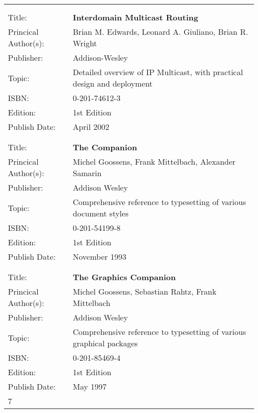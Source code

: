\documentclass[a4paper,12pt]{article}
\begin{document}
\begin{tabular}{ll}
	&	\\
	&	\\

Title: &	\textbf{Interdomain Multicast Routing}	\\
Princical Author(s): &	Brian M. Edwards, Leonard A. Giuliano, Brian R. Wright\\
Publisher:&	Addison-Wesley	\\	
Topic:	&	Detailed overview of IP Multicast, with practical design and deployment \\
ISBN:		&	0-201-74612-3 \\
Edition:	&	1st Edition \\
Publish Date:	&	April 2002 \\

	&	\\
	&	\\

Title: &	\textbf{The \latex  Companion}	\\
Princical Author(s): &	Michel Goossens, Frank Mittelbach, Alexander Samarin  \\
Publisher:&	Addison Wesley	\\	
Topic:	&	Comprehensive reference to \latex typesetting of various document styles \\
ISBN:		&	0-201-54199-8 \\
Edition:	&	1st Edition \\
Publish Date:	&	November 1993 \\

	&	\\
	&	\\

Title: &	\textbf{The \latex Graphics Companion}	\\
Princical Author(s): &	Michel Goossens, Sebastian Rahtz, Frank Mittelbach  \\
Publisher:&	Addison Wesley	\\	
Topic:	&	Comprehensive reference to \latex typesetting of various graphical packages \\
ISBN:		&	0-201-85469-4 \\
Edition:	&	1st Edition \\
Publish Date:	&	May 1997 \\7
\end{tabular}
\end{document}

